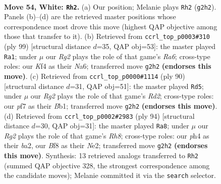 \documentclass[11pt]{article}
\begin{document}
\clearpage

\begin{figure}[p]\centering
\begin{subfigure}{0.46\textwidth}\centering
\resizebox{\linewidth}{!}{%
\newchessgame
\chessboard[
  setfen={5B2/5p1k/5n2/8/p3pK1p/P6P/3r1PR1/8 w - - 8 54},
  showmover=false,
  pgfstyle=straightmove, color=movearrow, markmove={g2-h2}
]}
\caption{}
\end{subfigure}\hfill
\begin{subfigure}{0.46\textwidth}\centering
\resizebox{\linewidth}{!}{%
\newchessgame
\chessboard[
  setfen={8/8/n1N3R1/1p6/1P1K2p1/r5k1/2P3P1/8 b - - 2 50},
  showmover=false,
  pgfstyle=straightmove, color=movearrow, markmove={a3-a1}
]}
\caption{}
\end{subfigure}
\\[4pt]
\begin{subfigure}{0.46\textwidth}\centering
\resizebox{\linewidth}{!}{%
\newchessgame
\chessboard[
  setfen={3r1k2/8/3P1p2/2n2P2/p7/Pp6/1K1R4/1B6 w - - 4 46},
  showmover=false,
  pgfstyle=straightmove, color=movearrow, markmove={d2-d5}
]}
\caption{}
\end{subfigure}\hfill
\begin{subfigure}{0.46\textwidth}\centering
\resizebox{\linewidth}{!}{%
\newchessgame
\chessboard[
  setfen={7R/p1k4P/P7/5p2/Kp6/3n2P1/b3N3/7r w - - 0 48},
  showmover=false,
  pgfstyle=straightmove, color=movearrow, markmove={h8-a8}
]}
\caption{}
\end{subfigure}
\caption{\textbf{Move 54, White: \texttt{Rh2}.} (a) Our position; Melanie plays \texttt{Rh2} (\texttt{g2h2}). Panels (b)--(d) are the retrieved master positions whose correspondence most drove this move (highest QAP objective among those that transfer to it). (b) Retrieved from \texttt{ccrl\_top\_p0003\#310} (ply 99) [structural distance $d$=35, QAP obj=53]: the master played \texttt{Ra1}; under $\mu$ our \emph{Rg2} plays the role of that game's \emph{Ra6}; cross-type roles: our \emph{K}f4 as their \emph{N}a6; transferred move \texttt{g2h2} \textbf{(endorses this move)}. (c) Retrieved from \texttt{ccrl\_top\_p0000\#1114} (ply 90) [structural distance $d$=31, QAP obj=51]: the master played \texttt{Rd5}; under $\mu$ our \emph{Rg2} plays the role of that game's \emph{Rd2}; cross-type roles: our \emph{p}f7 as their \emph{B}b1; transferred move \texttt{g2h2} \textbf{(endorses this move)}. (d) Retrieved from \texttt{ccrl\_top\_p0002\#2983} (ply 94) [structural distance $d$=30, QAP obj=31]: the master played \texttt{Ra8}; under $\mu$ our \emph{Rg2} plays the role of that game's \emph{Rh8}; cross-type roles: our \emph{p}h4 as their \emph{b}a2, our \emph{B}f8 as their \emph{N}e2; transferred move \texttt{g2h2} \textbf{(endorses this move)}. Synthesis: 13 retrieved analogs transferred to \texttt{Rh2} (summed QAP objective 328, the strongest correspondence among the candidate moves); Melanie committed it via the \texttt{search} selector.}
\label{fig:thought-m106}
\end{figure}
\end{document}
